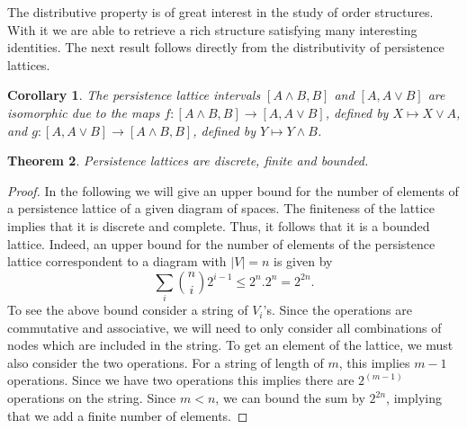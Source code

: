 \documentclass[10pt]{amsart}
\newtheorem{theorem}{Theorem}[section]
\newtheorem{corollary}[theorem]{Corollary}
\newtheorem{remark}[theorem]{Remark}
\begin{document}
The distributive property is of great interest in the study of order structures. With it we are able to retrieve a rich structure satisfying many interesting identities. The next result follows directly from the distributivity of persistence lattices.

\begin{corollary}
The persistence lattice intervals $[A \wedge B, B]$ and $[A, A \vee B]$ are isomorphic due to the maps $f: [A\wedge B,B] \rightarrow [A,A\vee B]$, defined by $X\mapsto X\vee A$, and $g:  [A, A\vee B] \rightarrow [A\wedge B,B]$, defined by $Y\mapsto Y\wedge B$.
\end{corollary}




\begin{theorem}\label{discrete}
Persistence lattices are discrete, finite and bounded.
\end{theorem}

\begin{proof}
In the following we will give an upper bound for the number of elements of a persistence lattice of a given diagram of spaces.
The finiteness of the lattice implies that it is discrete and complete. Thus, it follows that it is a bounded lattice. 
%
Indeed, an upper bound for the number of elements of the persistence lattice correspondent to a diagram with $\mid V\mid =n$ is given by 
\[
\sum_{i} \binom{n}{i} 2^{i-1}\leq 2^{n}.2^{n}=2^{2n}.
\]
To see the above bound consider a string of $V_i$'s. Since the
operations are commutative and associative, we will need to only
consider all combinations of nodes which are included in the string.
To get an element of the lattice, we must also consider the two operations. For a string of length of $m$, this implies $m-1$ operations. Since we have two operations this implies there are $2^{(m-1)}$ operations on the string. Since $m<n$, we can bound the sum by $2^{2n}$, implying that we add a  finite number of elements. 
\end{proof}
\end{document}

